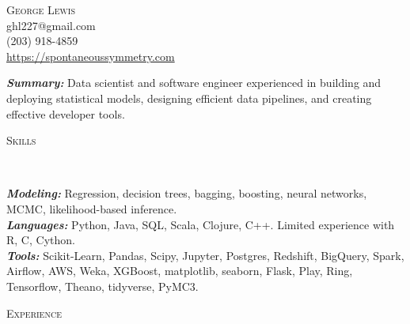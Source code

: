 \documentclass[9pt]{article}
\newenvironment{changemargin}[2]{%
  \begin{list}{}{%
    \setlength{\topsep}{0pt}%
    \setlength{\leftmargin}{#1}%
    \setlength{\rightmargin}{#2}%
    \setlength{\listparindent}{\parindent}%
    \setlength{\itemindent}{\parindent}%
    \setlength{\parsep}{\parskip}%
  }%
  \item[]}{\end{list}
}
\newcommand{\lineover}{
  \begin{changemargin}{-0.05in}{-0.05in}
    \vspace*{-8pt}
    \hrulefill \\
    \vspace*{-2pt}
  \end{changemargin}
}
\newcommand{\header}[1]{
  \begin{changemargin}{-0.5in}{-0.5in}
    \scshape{#1}\\
    \lineover
  \end{changemargin}
}
\newcommand{\contact}[4]{
  \begin{changemargin}{-0.5in}{-0.5in}
    \begin{center}
      {\Large \scshape {#1}}\\ \smallskip
      {#2}\\ \smallskip
      {#3}\\ \smallskip
      {#4}\smallskip
    \end{center}
  \end{changemargin}
}
\newenvironment{body} {
  \vspace*{-16pt}
\begin{changemargin}{-0.25in}{-0.5in}
  }
{\end{changemargin}
}
\begin{document}
\contact{George Lewis}
        {ghl227@gmail.com}
        {(203) 918-4859}
        {\url{https://spontaneoussymmetry.com}}
\smallskip

\begin{body}
  \vspace{14pt}
  \emph{\textbf{Summary:}}{} Data scientist and software engineer experienced in building and deploying statistical models, designing efficient data pipelines, and creating effective developer tools.

\end{body}

\smallskip

\header{Skills}
\begin{body}
  \vspace{14pt}
  \emph{\textbf{Modeling:}}{} Regression, decision trees, bagging, boosting, neural networks, MCMC, likelihood-based inference. \\
  \emph{\textbf{Languages:}}{} Python, Java, SQL, Scala, Clojure, C++.  Limited experience with R, C, Cython. \\
  \smallskip
  \emph{\textbf{Tools:}}{} Scikit-Learn, Pandas, Scipy, Jupyter, Postgres, Redshift, BigQuery, Spark, Airflow, AWS, Weka, XGBoost, matplotlib, seaborn, Flask, Play, Ring,  Tensorflow, Theano, tidyverse, PyMC3.  \\
\end{body}

\smallskip

\header{Experience}
\end{document}
